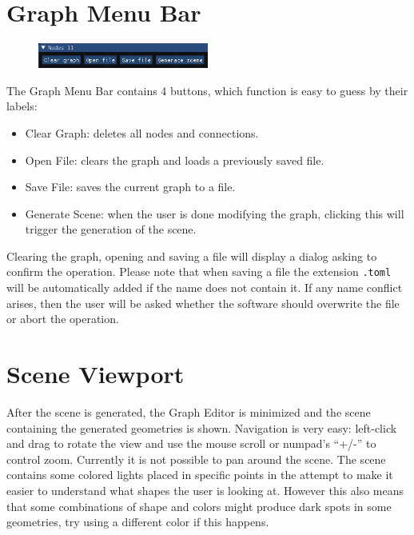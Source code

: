 \section{Graph Menu Bar}

\begin{figure}[H]
\centering
\includegraphics[width=0.5\textwidth]{figures/graph_menu_bar.png}
\end{figure}

The Graph Menu Bar contains 4 buttons, which function is easy to guess by their labels:

\begin{itemize}
    \item Clear Graph: deletes all nodes and connections.
    \item Open File: clears the graph and loads a previously saved file.
    \item Save File: saves the current graph to a file.
    \item Generate Scene: when the user is done modifying the graph, clicking this
        will trigger the generation of the scene.
\end{itemize}

Clearing the graph, opening and saving a file will display a dialog asking to confirm the operation.
Please note that when saving a file the extension \texttt{.toml} will be automatically added if
the name does not contain it. If any name conflict arises, then the user will be asked whether
the software should overwrite the file or abort the operation.

\section{Scene Viewport}

After the scene is generated, the Graph Editor is minimized and the scene containing the generated
geometries is shown. Navigation is very easy: left-click and drag to rotate the view and use
the mouse scroll or numpad's ``+/-'' to control zoom. Currently it is not possible to pan around the scene.
The scene contains some colored lights placed in specific points in the attempt to make it easier to
understand what shapes the user is looking at. However this also means that some combinations of shape
and colors might produce dark spots in some geometries, try using a different color if this happens.

